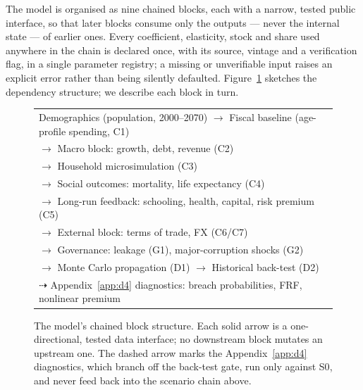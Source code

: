 \documentclass[11pt,a4paper]{article}
\begin{document}
The model is organised as nine chained blocks, each with a narrow, tested public interface, so that later blocks consume only the outputs --- never the internal state --- of earlier ones. Every coefficient, elasticity, stock and share used anywhere in the chain is declared once, with its source, vintage and a verification flag, in a single parameter registry; a missing or unverifiable input raises an explicit error rather than being silently defaulted. Figure~\ref{fig:chain} sketches the dependency structure; we describe each block in turn.

\begin{figure}[htbp]
\centering
\footnotesize
\begin{tabular}{@{}l@{}}
Demographics (population, 2000--2070) $\longrightarrow$ Fiscal baseline (age-profile spending, \textsc{C1}) \\
\hspace{3.0cm}$\longrightarrow$ Macro block: growth, debt, revenue (\textsc{C2}) \\
\hspace{6.0cm}$\longrightarrow$ Household microsimulation (\textsc{C3}) \\
\hspace{6.0cm}$\longrightarrow$ Social outcomes: mortality, life expectancy (\textsc{C4}) \\
\hspace{6.0cm}$\longrightarrow$ Long-run feedback: schooling, health, capital, risk premium (\textsc{C5}) \\
\hspace{6.0cm}$\longrightarrow$ External block: terms of trade, FX (\textsc{C6}/\textsc{C7}) \\
\hspace{3.0cm}$\longrightarrow$ Governance: leakage (\textsc{G1}), major-corruption shocks (\textsc{G2}) \\
\hspace{3.0cm}$\longrightarrow$ Monte Carlo propagation (\textsc{D1}) $\longrightarrow$ Historical back-test (\textsc{D2}) \\
\hspace{0.3cm}$\dashrightarrow$ Appendix~\ref{app:d4} diagnostics: breach probabilities, FRF, nonlinear premium
\end{tabular}
\caption{The model's chained block structure. Each solid arrow is a one-directional, tested data interface; no downstream block mutates an upstream one. The dashed arrow marks the Appendix~\ref{app:d4} diagnostics, which branch off the back-test gate, run only against \textsc{S0}, and never feed back into the scenario chain above.}
\label{fig:chain}
\end{figure}
\end{document}
